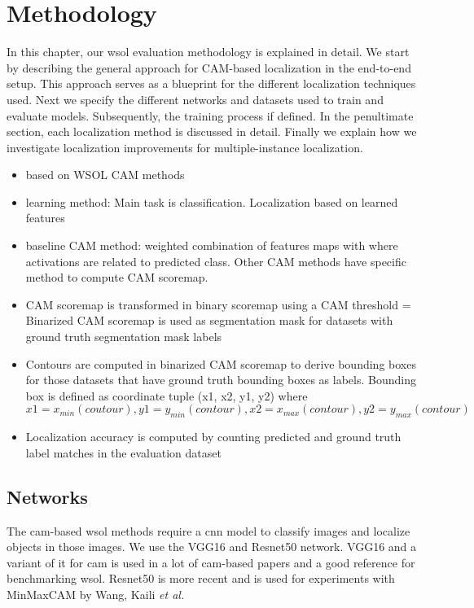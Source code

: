 \chapter{Methodology} \label{ch:methodology}

In this chapter, our \acrshort{wsol} evaluation methodology is explained in detail. We start by describing the general approach for CAM-based localization in the end-to-end setup. This approach serves as a blueprint for the different localization techniques used. Next we specify the different networks and datasets used to train and evaluate models. Subsequently, the training process if defined. In the penultimate section, each localization method is discussed in detail. Finally we explain how we investigate localization improvements for multiple-instance localization.

\begin{itemize}
    \item based on WSOL CAM methods
    \item learning method: Main task is classification. Localization based on learned features
    \item baseline CAM method: weighted combination of features maps with where activations are related to predicted class. Other CAM methods have specific method to compute CAM scoremap.
    \item CAM scoremap is transformed in binary scoremap using a CAM threshold = Binarized CAM scoremap is used as segmentation mask for datasets with ground truth segmentation mask labels
    \item Contours are computed in binarized CAM scoremap to derive bounding boxes for those datasets that have ground truth bounding boxes as labels. Bounding box is defined as coordinate tuple (x1, x2, y1, y2) where $x1 = x_{min}(coutour), y1 = y_{min}(contour), x2 = x_{max}(contour), y2 = y_{max}(contour)$
    \item Localization accuracy is computed by counting predicted and ground truth label matches in the evaluation dataset
\end{itemize}

\section{Networks}
The \acrshort{cam}-based \acrshort{wsol} methods require a \acrshort{cnn} model to classify images and localize objects in those images. We use the VGG16 and Resnet50 network. VGG16 and a variant of it for \acrshort{cam} is used in a lot of \acrshort{cam}-based papers and a good reference for benchmarking \acrshort{wsol}. Resnet50 is more recent and is used for experiments with MinMaxCAM by Wang, Kaili \textit{et al.}

